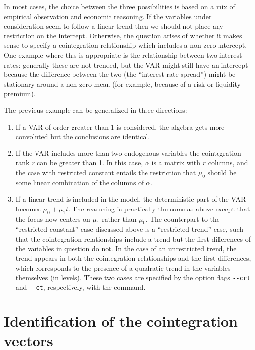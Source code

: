 In most cases, the choice between the three possibilities is based on
a mix of empirical observation and economic reasoning. If the
variables under consideration seem to follow a linear trend then we
should not place any restriction on the intercept. Otherwise, the
question arises of whether it makes sense to specify a cointegration
relationship which includes a non-zero intercept. One example where
this is appropriate is the relationship between two interest rates:
generally these are not trended, but the VAR might still have an
intercept because the difference between the two (the ``interest rate
spread'') might be stationary around a non-zero mean (for example,
because of a risk or liquidity premium).
    
The previous example can be generalized in three directions:
    
\begin{enumerate}
\item If a VAR of order greater than 1 is considered, the algebra gets
  more convoluted but the conclusions are identical.
\item If the VAR includes more than two endogenous variables the
  cointegration rank $r$ can be greater than 1. In this case, $\alpha$
  is a matrix with $r$ columns, and the case with restricted constant
  entails the restriction that $\mu_0$ should be some
  linear combination of the columns of $\alpha$.
\item If a linear trend is included in the model, the deterministic
  part of the VAR becomes $\mu_0 + \mu_1 t$. The reasoning is
  practically the same as above except that the focus now centers on
  $\mu_1$ rather than $\mu_0$.  The counterpart to the ``restricted
  constant'' case discussed above is a ``restricted trend'' case, such
  that the cointegration relationships include a trend but the first
  differences of the variables in question do not.  In the case of an
  unrestricted trend, the trend appears in both the cointegration
  relationships and the first differences, which corresponds to the
  presence of a quadratic trend in the variables themselves (in
  levels).  These two cases are specified by the option flags
  \verb+--crt+ and \verb+--ct+, respectively, with the 
  command.
\end{enumerate}

\section{Identification of the cointegration vectors}
\label{sec:johansen-ident}

